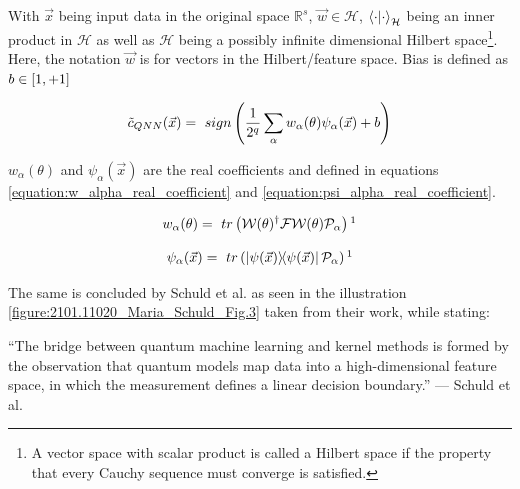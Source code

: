 With $\vec{x}$ being input data in the original space $\mathbb{R}^s$, $\Vec{w} \in \mathcal{H}$, $\ip{\cdot}{\cdot}_{\mathcal{H}}$ being an inner product in $\mathcal{H}$ as well as $\mathcal{H}$ being a possibly infinite dimensional Hilbert space\footnote{A vector space with scalar product is called a Hilbert space if the property that every Cauchy sequence must converge is satisfied.}. Here, the notation $\Vec{w}$ is for vectors in the Hilbert/feature space. Bias is defined as $b \in [\-1, +1]$

\begin{equation}
    \centering
        \tilde{c}_{QNN}(\vec{x}) =\ sign\left(\frac{1}{2^q} \sum_{\alpha} w_{\alpha}(\theta)\psi_{\alpha}(\vec{x})+b\right)
    \label{equation:qnn_decision_function}
\end{equation}

$w_{\alpha}(\theta)$ and $\psi_{\alpha}(\vec{x})$ are the real coefficients and defined in equations \ref{equation:w_alpha_real_coefficient} and \ref{equation:psi_alpha_real_coefficient}.

\begin{equation}
    \centering
        w_{\alpha}(\theta) =\ tr\left(\mathcal{W}(\theta)^{\dag}\mathcal{F}\mathcal{W}(\theta)\mathcal{P}_{\alpha}\right)\footnotemark[1]
    \label{equation:w_alpha_real_coefficient}
\end{equation}

\begin{equation}
    \centering
        \psi_{\alpha}(\vec{x}) =\ tr\left(\op{\psi(\vec{x})}{\psi(\vec{x})}\mathcal{P}_{\alpha}\right)\footnotemark[1]
    \label{equation:psi_alpha_real_coefficient}
\end{equation}


The same is concluded by Schuld et al.\cite{schuld_SQMLmodelsAreKernelMethods} as seen in the illustration \ref{figure:2101.11020_Maria_Schuld_Fig.3} taken from their work, while stating: 

\begin{displayquote}
“The bridge between quantum machine learning and kernel methods is formed by the observation that quantum models map data into a high-dimensional feature space, in which the measurement defines a linear decision boundary.” — Schuld et al.\cite{schuld_SQMLmodelsAreKernelMethods}
\end{displayquote}

